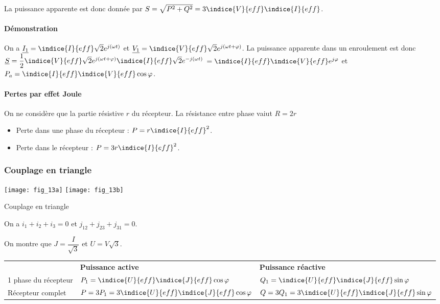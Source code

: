 La puissance apparente est donc donnée par $S = \sqrt{P^2 + Q^2} = 3 \indice{V}{eff}\indice{I}{eff}$.

\paragraph{Démonstration}
On a $\underline{I_1} = \indice{I}{eff} \sqrt{2} e^{j\left(\omega t\right)} $ et 
$\underline{V_1} = \indice{V}{eff} \sqrt{2}e^{j\left(\omega t + \varphi\right)}$. La puissance apparente dans un enroulement est donc   
$\underline{S} = \dfrac{1}{2} \indice{V}{eff} \sqrt{2}e^{j\left(\omega t + \varphi\right)}
\indice{I}{eff} \sqrt{2} e^{-j\left(\omega t\right)}$
$= \indice{I}{eff}\indice{V}{eff} e^{j \varphi}$
 et $P_a =\indice{I}{eff}\indice{V}{eff} \cos\varphi$. 
\paragraph{Pertes par effet Joule}
On ne considère que la partie résistive $r$ du récepteur. La résistance entre phase vaiut $R = 2r$
\begin{itemize}
\item Perte dans une phase du récepteur : $P = r\indice{I}{eff}^2$.
\item Perte dans le récepteur : $P = 3 r\indice{I}{eff}^2$.
\end{itemize}



\subsubsection{Couplage en triangle}


\begin{marginfigure}
\centering
\texttt{[image: fig\_13a]}
\texttt{[image: fig\_13b]}
\caption{Couplage en triangle \label{fig:ge:cours:13}}
\end{marginfigure}

On a  $i_1 + i_2 + i_3 = 0$ et $j_{12}+j_{23}+j_{31}=0$.

On montre que $J = \dfrac{I}{\sqrt{3}}$ et $U = V\sqrt{3}$.

\begin{tabular}{lll}
\hline
& \textbf{Puissance active} & \textbf{Puissance réactive} \\ 
1 phase du récepteur & 
$P_1 = \indice{U}{eff}\indice{J}{eff} \cos \varphi$ &
$Q_1 = \indice{U}{eff}\indice{J}{eff} \sin \varphi$ \\
Récepteur complet & 
$P = 3P_1 =  3\indice{U}{eff}\indice{J}{eff} \cos \varphi$ &
$Q = 3Q_1 = 3 \indice{U}{eff}\indice{J}{eff} \sin \varphi$ \\
\hline
\end{tabular}

